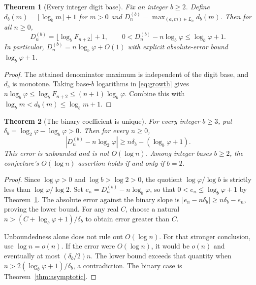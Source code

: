 \documentclass[11pt]{article}
\newtheorem{theorem}{Theorem}
\newcommand{\ph}{\varphi}
\begin{document}
\begin{theorem}[Every integer digit base]\label{thm:allbases}
Fix an integer $b\ge2$. Define $d_b(m)=\lfloor\log_b m\rfloor+1$ for
$m>0$ and $D_n^{(b)}=\max_{(a,m)\in L_n}d_b(m)$. Then for all $n\ge0$,
\[
 D_n^{(b)}=\lfloor\log_b F_{n+2}\rfloor+1,\qquad
 0<D_n^{(b)}-n\log_b\ph\le\log_b\ph+1.
\]
In particular, $D_n^{(b)}=n\log_b\ph+O(1)$ with explicit absolute-error
bound $\log_b\ph+1$.
\end{theorem}
\begin{proof}
The attained denominator maximum is independent of the digit base, and
$d_b$ is monotone. Taking base-$b$ logarithms in \eqref{eq:growth} gives
$n\log_b\ph\le\log_b F_{n+2}\le(n+1)\log_b\ph$.
Combine this with $\log_b m<d_b(m)\le\log_b m+1$.
\end{proof}

\begin{theorem}[The binary coefficient is unique]\label{thm:wrongbase}
For every integer $b\ge3$, put $\delta_b=\log_2\ph-\log_b\ph>0$.
Then for every $n\ge0$,
\[
 \left|D_n^{(b)}-n\log_2\ph\right|
 \ge n\delta_b-(\log_b\ph+1).
\]
This error is unbounded and is not $O(\log n)$. Among integer bases
$b\ge2$, the conjecture's $O(\log n)$ assertion holds if and only if $b=2$.
\end{theorem}
\begin{proof}
Since $\log\ph>0$ and $\log b>\log2>0$, the quotient
$\log\ph/\log b$ is strictly less than $\log\ph/\log2$. Set
$e_n=D_n^{(b)}-n\log_b\ph$, so that $0<e_n\le\log_b\ph+1$ by
Theorem~\ref{thm:allbases}. The absolute error against the binary slope
is $|e_n-n\delta_b|\ge n\delta_b-e_n$, proving the lower bound.
For any real $C$, choose a natural $n>(C+\log_b\ph+1)/\delta_b$ to
obtain error greater than $C$.

Unboundedness alone does not rule out $O(\log n)$. For that stronger
conclusion, use $\log n=o(n)$. If the error were $O(\log n)$, it would
be $o(n)$ and eventually at most $(\delta_b/2)n$. The lower bound exceeds
that quantity when $n>2(\log_b\ph+1)/\delta_b$, a contradiction.
The binary case is Theorem~\ref{thm:asymptotic}.
\end{proof}
\end{document}
